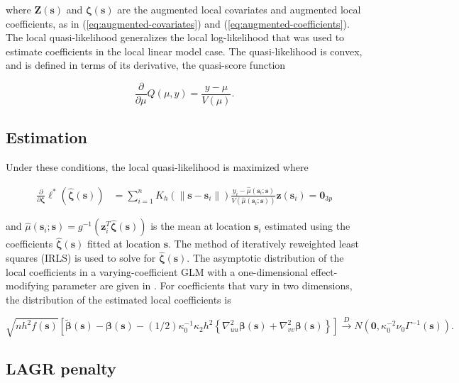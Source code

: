 \documentclass[authoryear,review, 12pt]{elsarticle}
\begin{document}
where $\bm{Z}\left(\bm{s}\right)$ and $\bm{\zeta}\left(\bm{s}\right)$
are the augmented local covariates and augmented local coefficients,
as in (\ref{eq:augmented-covariates}) and (\ref{eq:augmented-coefficients}).
The local quasi-likelihood generalizes the local log-likelihood that
was used to estimate coefficients in the local linear model case.
The quasi-likelihood is convex, and is defined in terms of its derivative,
the quasi-score function

\[
\frac{\partial}{\partial\mu}Q\left(\mu,y\right)=\frac{y-\mu}{V\left(\mu\right)}.
\]



\subsection{Estimation}

Under these conditions, the local quasi-likelihood is maximized where

\begin{align}
\frac{\partial}{\partial\bm{\zeta}}\mathcal{\ell}^{*}\left(\hat{\bm{\zeta}}\left(\bm{s}\right)\right) & =\sum_{i=1}^{n}K_{h}\left(\|\bm{s}-\bm{s}_{i}\|\right)\frac{y_{i}-\hat{\mu}\left(\bm{s}_{i};\bm{s}\right)}{V\left(\hat{\mu}\left(\bm{s}_{i};\bm{s}\right)\right)}\bm{z}\left(\bm{s}_{i}\right)=\bm{0}_{3p}
\end{align}


and $\hat{\mu}\left(\bm{s}_{i};\bm{s}\right)=g^{-1}\left(\bm{z}_{i}^{T}\hat{\bm{\zeta}}\left(\bm{s}\right)\right)$
is the mean at location $\bm{s}_{i}$ estimated using the coefficients
$\hat{\bm{\zeta}}\left(\bm{s}\right)$ fitted at location $\bm{s}$.
The method of iteratively reweighted least squares (IRLS) is used
to solve for $\hat{\bm{\zeta}}\left(\bm{s}\right)$. The asymptotic
distribution of the local coefficients in a varying-coefficient GLM
with a one-dimensional effect-modifying parameter are given in \citet{Cai-Fan-Li-2000}.
For coefficients that vary in two dimensions, the distribution of
the estimated local coefficients is

\[
\sqrt{{nh^{2}f(\bm{{s}})}}\left[\tilde{\bm{\beta}}(\bm{s})-\bm{\beta}(\bm{s})-(1/2)\kappa_{0}^{-1}\kappa_{2}h^{2}\left\{ \nabla_{uu}^{2}\bm{\beta}(\bm{s})+\nabla_{vv}^{2}\bm{\beta}(\bm{s})\right\} \right]\xrightarrow{{D}}N\left(\bm{0},\kappa_{0}^{-2}\nu_{0}\Gamma^{-1}(\bm{s})\right).
\]



\subsection{LAGR penalty}
\end{document}
